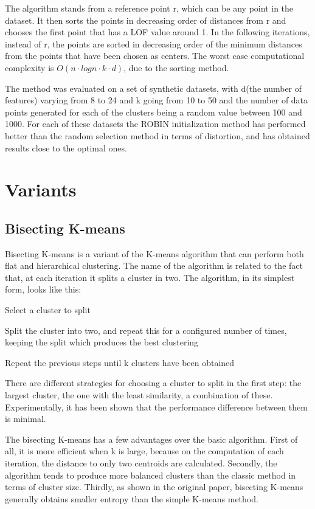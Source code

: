 \documentclass[12pt]{article}
\begin{document}
	The algorithm stands from a reference point r, which can be any point in the dataset. It then sorts the points in decreasing order of distances from r and chooses the first point that has a LOF value around 1. In the following iterations, instead of r, the points are sorted in decreasing order of the minimum distances from the points that have been chosen as centers. The worst case computational complexity is \(O(n\cdot logn\cdot k\cdot d)\), due to the sorting method.
	
	The method was evaluated on a set of synthetic datasets, with d(the number of features) varying from 8 to 24 and k going from 10 to 50 and the number of data points generated for each of the clusters being a random value between 100 and 1000. For each of these datasets the ROBIN initialization method has performed better than the random selection method in terms of distortion, and has obtained results close to the optimal ones.
	
	\section{Variants}
	\subsection{Bisecting K-means} 
	Bisecting K-means\cite{BisectingKmeans} is a variant of the K-means algorithm that can perform both flat and hierarchical clustering. The name of the algorithm is related to the fact that, at each iteration it splits a cluster in two. The algorithm, in its simplest form, looks like this:
	\begin{compactenum}
		\item Select a cluster to split
		\item Split the cluster into two, and repeat this for a configured number of times, keeping the split which produces the best clustering
		\item Repeat the previous steps until k clusters have been obtained
	\end{compactenum}
	
	There are different strategies for choosing a cluster to split in the first step: the largest cluster, the one with the least similarity, a combination of these. Experimentally, it has been shown that the performance difference between them is minimal.
	
	The bisecting K-means has a few advantages over the basic algorithm. First of all, it is more efficient when k is large, because on the computation of each iteration, the distance to only two centroids are calculated. Secondly, the algorithm tends to produce more balanced clusters than the classic method in terms of cluster size. Thirdly, as shown in the original paper\cite{BisectingKmeans}, bisecting K-means generally obtains smaller entropy than the simple K-means method. 
	
\end{document}
